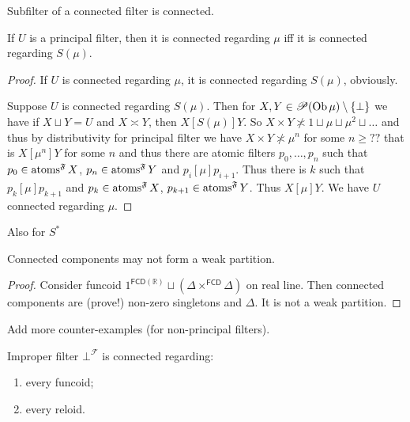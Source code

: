\begin{obvious}
Subfilter of a connected filter is connected.
\end{obvious}

\begin{prop}
  If $U$ is a principal filter, then it is connected regarding $\mu$ iff it is
  connected regarding $S (\mu)$.
\end{prop}

\begin{proof}
  If $U$ is connected regarding $\mu$, it is connected regarding $S (\mu)$,
  obviously.

  Suppose $U$ is connected regarding $S (\mu)$. Then for $X, Y \in \mathscr{P}
  (\operatorname{Ob} \mu) \setminus \{ \bot \}$ we have if $X \sqcup Y = U$ and $X
  \asymp Y$, then $X \mathrel{[S (\mu)]} Y$. So $X \times Y \nasymp 1 \sqcup
  \mu \sqcup \mu^2 \sqcup \ldots$ and thus by distributivity for principal
  filter we have $X \times Y \nasymp \mu^n$ for some $n \geq ? ?$ that is $X
  \mathrel{[\mu^n]} Y$ for some $n$ and thus there are atomic filters $p_0,
  \ldots, p_n$ such that $p_0 \in \operatorname{atoms}^{\mathfrak{F}} X$, $p_n \in
  \operatorname{atoms}^{\mathfrak{F}} Y$ and $p_i \mathrel{[\mu]} p_{i + 1}$. Thus
  there is $k$ such that $p_k \mathrel{[\mu]} p_{k + 1}$ and $p_k \in
  \operatorname{atoms}^{\mathfrak{F}} X$, $p_{k + 1} \in \operatorname{atoms}^{\mathfrak{F}}
  Y$. Thus $X \mathrel{[\mu]} Y$. We have $U$ connected regarding $\mu$.
\end{proof}

Also for $S^{\ast}$

\begin{example}
  Connected components may not form a weak partition.
\end{example}

\begin{proof}
  Consider funcoid $1^{\mathsf{FCD}(\mathbb{R})}\sqcup(\Delta \times^{\mathsf{FCD}} \Delta)$ on real line.
  Then connected components are (prove!) non-zero singletons and $\Delta$. It
  is not a weak partition.
\end{proof}

Add more counter-examples (for non-principal filters).


\begin{obvious}
Improper filter $\bot^{\mathscr{F}}$ is connected regarding:
\begin{enumerate}
  \item every funcoid;
  \item every reloid.
\end{enumerate}{\hspace*{\fill}}{\medskip}
\end{obvious}

